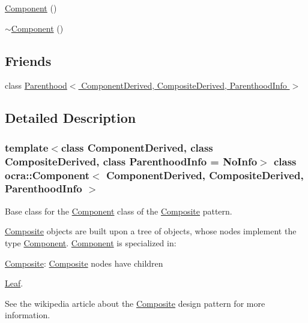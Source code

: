 {\bf }\par
\begin{DoxyCompactItemize}
\item 
\hyperlink{classocra_1_1Component_a4c76a9060703e7f524c73f6b328bb3e1}{Component} ()
\item 
\hyperlink{classocra_1_1Component_a616d0b940599b102fa630107ec169e58}{$\sim$\+Component} ()
\end{DoxyCompactItemize}

\subsection*{Friends}
\begin{DoxyCompactItemize}
\item 
class \hyperlink{classocra_1_1Component_ad71e675afae5fce6263d2d784cd3907a}{Parenthood$<$ Component\+Derived, Composite\+Derived, Parenthood\+Info $>$}
\end{DoxyCompactItemize}


\subsection{Detailed Description}
\subsubsection*{template$<$class Component\+Derived, class Composite\+Derived, class Parenthood\+Info = No\+Info$>$\newline
class ocra\+::\+Component$<$ Component\+Derived, Composite\+Derived, Parenthood\+Info $>$}

Base class for the \hyperlink{classocra_1_1Component}{Component} class of the \hyperlink{classocra_1_1Composite}{Composite} pattern. 

\hyperlink{classocra_1_1Composite}{Composite} objects are built upon a tree of objects, whose nodes implement the type \hyperlink{classocra_1_1Component}{Component}. \hyperlink{classocra_1_1Component}{Component} is specialized in\+:
\begin{DoxyItemize}
\item \hyperlink{classocra_1_1Composite}{Composite}\+: \hyperlink{classocra_1_1Composite}{Composite} nodes have children
\item \hyperlink{classocra_1_1Leaf}{Leaf}.
\end{DoxyItemize}

See the wikipedia article about the \hyperlink{classocra_1_1Composite}{Composite} design pattern for more information.

